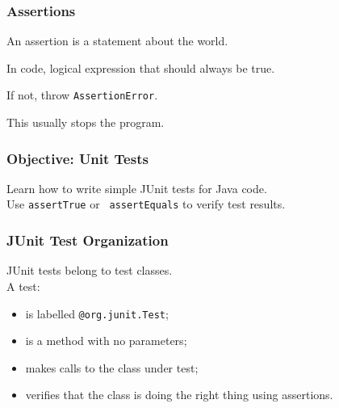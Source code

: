 \begin{frame}
\frametitle{Assertions}
\begin{changemargin}{1cm}

An assertion is a statement about the world.

In code, logical expression that should always be true.

If not, throw \texttt{AssertionError}.

This usually stops the program. 

\end{changemargin}

\end{frame}



\begin{frame}
\frametitle{Objective: Unit Tests}

\begin{changemargin}{1cm}

Learn how to write simple JUnit 
tests for Java code.\\[1em]

Use {\tt assertTrue} or {\tt
  assertEquals} to verify test results.
\end{changemargin}

\end{frame}

\begin{frame}
\frametitle{JUnit Test Organization}

\large
\begin{changemargin}{1cm}
JUnit tests belong to test classes.\\[1em]

A test:
\begin{itemize}
\item is labelled {\tt @org.junit.Test};
\item is a method with no parameters;
\item makes calls to the class under test;
\item verifies that the class is doing the right thing using assertions.
\end{itemize}

\end{changemargin}
\end{frame}

